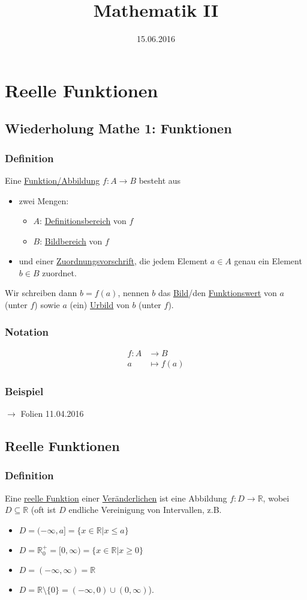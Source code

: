 \documentclass[12pt, titlepage]{article}
\title{Mathematik II}
\date{15.06.2016}
\newcommand{\R}{\mathds{R}}
\renewcommand{\>}{\rightarrow}
\renewcommand{\*}{\cdot}
\begin{document}
	\maketitle
	\tableofcontents
	\newpage
	\section{Reelle Funktionen}
	\subsection{Wiederholung Mathe 1: Funktionen}
	\subsubsection*{Definition}
		Eine \underline{Funktion/Abbildung} $f\colon A\> B$ besteht aus
		\begin{itemize}
			\item zwei Mengen:
			\begin{itemize}
				\item $A$: \underline{Definitionsbereich} von $f$
				\item $B$: \underline{Bildbereich} von $f$
			\end{itemize}
			\item und einer \underline{Zuordnungsvorschrift}, die jedem Element $a\in A$ genau ein Element $b\in B$ zuordnet.
		\end{itemize}
		Wir schreiben dann $b=f(a)$, nennen $b$ das \underline{Bild}/den \underline{Funktionswert} von $a$ (unter $f$) sowie $a$ (ein) \underline{Urbild} von $b$ (unter $f$).
	\subsubsection*{Notation}
		\vspace{-1cm}\begin{align*}
			f\colon A&\> B\\
			a&\mapsto f(a)
		\end{align*}
	\subsubsection*{Beispiel}
		$\>$ Folien 11.04.2016
	\subsection{Reelle Funktionen}
	\subsubsection*{Definition}
	Eine \underline{reelle Funktion} einer \underline{Veränderlichen} ist eine Abbildung $f\colon D\> \R$, wobei $D\subseteq \R$ (oft ist $D$ endliche Vereinigung von Intervallen, z.B.
	\begin{itemize}
		\item $ D=(-\infty,a]=\{x\in \R|x\leq a\} $
		\item $ D=\R^+_0=[0,\infty)=\{x\in\R|x\geq 0\}$
		\item $ D=(-\infty,\infty)=\R $
		\item $ D=\R\setminus\{0\}=(-\infty,0)\cup(0,\infty) $\hfill).
	\end{itemize}
\end{document}
